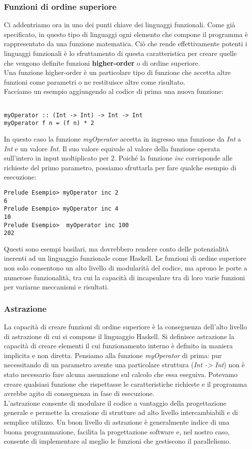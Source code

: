 \subsubsection{Funzioni di ordine superiore}
Ci addentriamo ora in uno dei punti chiave dei linguaggi funzionali. Come già specificato, in questo tipo di linguaggi ogni elemento che compone il programma è rappresentato da una funzione matematica. Ciò che rende effettivamente potenti i linguaggi funzionali è lo sfruttamento di questa caratteristica per creare quelle che vengono definite funzioni \textbf{higher-order} o di ordine superiore.\\
Una funzione higher-order è un particolare tipo di funzione che accetta altre funzioni come parametri o ne restituisce altre come risultato.\\
Facciamo un esempio aggiungendo al codice di prima una nuova funzione:
\begin{verbatim}

myOperator :: (Int -> Int) -> Int -> Int
myOperator f n = (f n) * 2 

\end{verbatim}
In questo caso la funzione \textit{myOperator} accetta in ingresso una funzione da \textit{Int} a \textit{Int} e un valore \textit{Int}. Il suo valore equivale al valore della funzione operata sull'intero in input moltiplicato per 2. Poiché la funzione \textit{inc} corrisponde alle richieste del primo parametro, possiamo sfruttarla per fare qualche esempio di esecuzione:
\begin{verbatim}
Prelude Esempio> myOperator inc 2
6
Prelude Esempio> myOperator inc 4
10
Prelude Esempio>  myOperator inc 100
202
\end{verbatim}
Questi sono esempi basilari, ma dovrebbero rendere conto delle potenzialità inerenti ad un linguaggio funzionale come Haskell. Le funzioni di ordine superiore non solo consentono un alto livello di modularità del codice, ma aprono le porte a numerose funzionalità, tra cui la capacità di incapsulare tra di loro varie funzioni per variarne meccanismi e risultati.
\subsubsection{Astrazione}
La capacità di creare funzioni di ordine superiore è la conseguenza dell'alto livello di astrazione di cui si compone il linguaggio Haskell. Si definisce astrazione la capacità di creare elementi il cui funzionamento interno è definito in maniera implicita e non diretta. Pensiamo alla funzione \textit{myOperator} di prima: pur necessitando di un parametro avente una particolare struttura (\textit{Int -> Int}) non è stato necessario fare alcuna assunzione sul calcolo che essa eseguiva. Potevamo creare qualsiasi funzione che rispettasse le caratteristiche richieste e il programma avrebbe agito di conseguenza in fase di esecuzione.\\
L'astrazione consente di modulare il codice a vantaggio della progettazione generale e permette la creazione di strutture ad alto livello intercambiabili e di semplice utilizzo. Un buon livello di astrazione è generalmente indice di una buona programmazione, facilita la progettazione software e, nel nostro caso, consente di implementare al meglio le funzioni che gestiscono il parallelismo.

